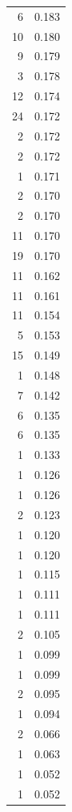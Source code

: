 \begin{tabular}{rr}
6 & 0.183 \\
10 & 0.180 \\
9 & 0.179 \\
3 & 0.178 \\
12 & 0.174 \\
24 & 0.172 \\
2 & 0.172 \\
2 & 0.172 \\
1 & 0.171 \\
2 & 0.170 \\
2 & 0.170 \\
11 & 0.170 \\
19 & 0.170 \\
11 & 0.162 \\
11 & 0.161 \\
11 & 0.154 \\
5 & 0.153 \\
15 & 0.149 \\
1 & 0.148 \\
7 & 0.142 \\
6 & 0.135 \\
6 & 0.135 \\
1 & 0.133 \\
1 & 0.126 \\
1 & 0.126 \\
2 & 0.123 \\
1 & 0.120 \\
1 & 0.120 \\
1 & 0.115 \\
1 & 0.111 \\
1 & 0.111 \\
2 & 0.105 \\
1 & 0.099 \\
1 & 0.099 \\
2 & 0.095 \\
1 & 0.094 \\
2 & 0.066 \\
1 & 0.063 \\
1 & 0.052 \\
1 & 0.052 \\
\bottomrule
\end{tabular}

